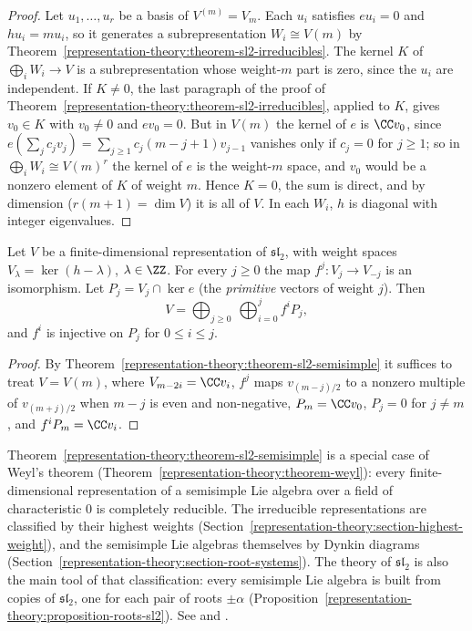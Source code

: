 \begin{proof}
Let $u_1, \ldots, u_r$ be a basis of $V^{(m)} = V_m$. Each $u_i$ satisfies $eu_i = 0$ and $hu_i = mu_i$, so it generates a
subrepresentation $W_i \cong V(m)$ by Theorem~\ref{representation-theory:theorem-sl2-irreducibles}. The kernel $K$
of $\bigoplus_i W_i \to V$ is a subrepresentation whose weight-$m$ part is zero, since the $u_i$ are independent. If
$K \neq 0$, the last paragraph of the proof of Theorem~\ref{representation-theory:theorem-sl2-irreducibles},
applied to $K$, gives $v_0 \in K$ with $v_0 \neq 0$ and $ev_0 = 0$. But in $V(m)$ the kernel of $e$ is $\CC v_0$, since
$e(\sum_j c_jv_j) = \sum_{j \geq 1} c_j(m - j + 1)v_{j-1}$ vanishes only if $c_j = 0$ for $j \geq 1$; so in
$\bigoplus_i W_i \cong V(m)^r$ the kernel of $e$ is the weight-$m$ space, and $v_0$ would be a nonzero element of
$K$ of weight $m$. Hence $K = 0$, the sum is direct, and by dimension ($r(m + 1) = \dim V$) it is all of $V$. In each
$W_i$, $h$ is diagonal with integer eigenvalues.
\end{proof}

\begin{corollary}\label{representation-theory:corollary-lefschetz-structure}
Let $V$ be a finite-dimensional representation of $\mathfrak{sl}_2$, with weight spaces $V_\lambda = \ker(h - \lambda)$,
$\lambda \in \ZZ$. For every $j \geq 0$ the map $f^j \colon V_j \to V_{-j}$ is an isomorphism. Let
$P_j = V_j \cap \ker e$ (the \emph{primitive} vectors of weight $j$). Then
\[
V = \bigoplus_{j \geq 0}\ \bigoplus_{i = 0}^{j} f^i P_j,
\]
and $f^i$ is injective on $P_j$ for $0 \leq i \leq j$.
\end{corollary}

\begin{proof}
By Theorem~\ref{representation-theory:theorem-sl2-semisimple} it suffices to treat $V = V(m)$, where
$V_{m - 2i} = \CC v_i$, $f^j$ maps $v_{(m-j)/2}$ to a nonzero multiple of $v_{(m+j)/2}$ when $m - j$ is even and non-negative,
$P_m = \CC v_0$, $P_j = 0$ for $j \neq m$, and $f^iP_m = \CC v_i$.
\end{proof}

\begin{remark}\label{representation-theory:remark-semisimple-lie-algebras}
Theorem~\ref{representation-theory:theorem-sl2-semisimple} is a special case of Weyl's theorem
(Theorem~\ref{representation-theory:theorem-weyl}): every finite-dimensional representation of a semisimple Lie algebra over a field of characteristic $0$ is completely
reducible. The irreducible representations are classified by their highest weights (Section~\ref{representation-theory:section-highest-weight}), and the semisimple Lie
algebras themselves by Dynkin diagrams (Section~\ref{representation-theory:section-root-systems}). The theory of $\mathfrak{sl}_2$ is also the main tool of that
classification: every semisimple Lie algebra is built from copies of $\mathfrak{sl}_2$, one for each pair of roots $\pm\alpha$
(Proposition~\ref{representation-theory:proposition-roots-sl2}). See \cite{humphreys-lie} and \cite{fulton-harris}.
\end{remark}

